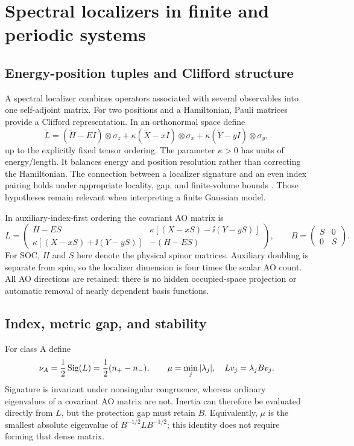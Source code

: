 \section{Spectral localizers in finite and periodic systems}
\label{sec:localizer}
\subsection{Energy-position tuples and Clifford structure}
A spectral localizer combines operators associated with several
observables into one self-adjoint matrix. For two positions and a
Hamiltonian, Pauli matrices provide a Clifford representation.
In an orthonormal space define
\begin{equation}
 \widetilde L=
 (\widetilde H-EI)\otimes\sigma_z+
 \kappa(\widetilde X-xI)\otimes\sigma_x+
 \kappa(\widetilde Y-yI)\otimes\sigma_y ,
 \label{eq:clifford-localizer}
\end{equation}
up to the explicitly fixed tensor ordering.
The parameter $\kappa>0$ has units of energy/length.
It balances energy and position resolution rather than correcting
the Hamiltonian. The connection between a localizer signature and
an even index pairing holds under appropriate locality, gap, and
finite-volume bounds \cite{LoringSchulzBaldes2020}.
Those hypotheses remain relevant when interpreting a finite Gaussian model.

In auxiliary-index-first ordering the covariant AO matrix is
\begin{equation}
 L=
 \begin{pmatrix}
 H-ES & \kappa[(X-xS)-\ii(Y-yS)]\\
 \kappa[(X-xS)+\ii(Y-yS)] & -(H-ES)
 \end{pmatrix},\qquad
 B=\begin{pmatrix}S&0\\0&S\end{pmatrix}.
 \label{eq:covariant-localizer}
\end{equation}
For SOC, $H$ and $S$ here denote the physical spinor matrices.
Auxiliary doubling is separate from spin, so the localizer dimension
is four times the scalar AO count. All AO directions are retained:
there is no hidden occupied-space projection or automatic removal
of nearly dependent basis functions.

\subsection{Index, metric gap, and stability}
For class A define
\begin{equation}
 \nu_A=\frac12\operatorname{Sig}(L)=\frac12(n_+-n_-),\qquad
 \mu=\min_j|\lambda_j|,\quad Lv_j=\lambda_j Bv_j .
 \label{eq:index-gap}
\end{equation}
Signature is invariant under nonsingular congruence, whereas ordinary
eigenvalues of a covariant AO matrix are not.
Inertia can therefore be evaluated directly from $L$, but the
protection gap must retain $B$. Equivalently, $\mu$ is the smallest
absolute eigenvalue of $B^{-1/2}LB^{-1/2}$; this identity does not
require forming that dense matrix.

